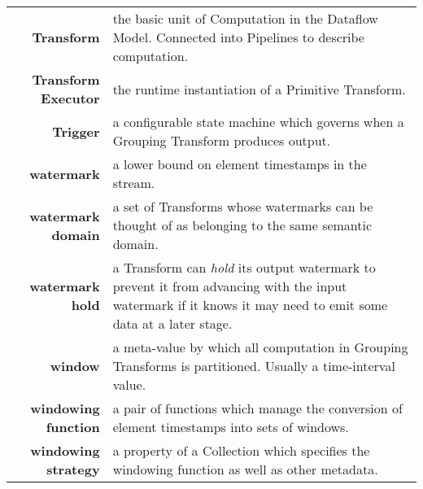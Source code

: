{\begin{longtabu}{rX[p]}
	\textbf{Transform} & the basic unit of Computation in the Dataflow Model. Connected into Pipelines to describe computation. \\
	\textbf{Transform Executor} & the runtime instantiation of a Primitive Transform. \\
	\textbf{Trigger} & a configurable state machine which governs when a Grouping Transform produces output. \\
	\textbf{watermark} & a lower bound on element timestamps in the stream. \\
	\textbf{watermark domain} & a set of Transforms whose watermarks can be thought of as belonging to the same semantic domain. \\
	\textbf{watermark hold} & a Transform can \emph{hold} its output watermark to prevent it from advancing with the input watermark if it knows it may need to emit some data at a later stage. \\
	\textbf{window} & a meta-value by which all computation in Grouping Transforms is partitioned. Usually a time-interval value. \\
	\textbf{windowing function} & a pair of functions which manage the conversion of element timestamps into sets of windows. \\
	\textbf{windowing strategy} & a property of a Collection which specifies the windowing function as well as other metadata.
\end{longtabu}
}